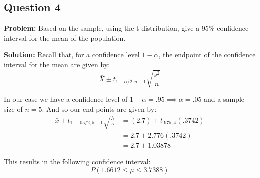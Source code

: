 \documentclass{article}
\begin{document}
\subsection*{Question 4}
\noindent\textbf{Problem:} Based on the sample, using the t-distribution, give a 95\% confidence interval for the mean of the population.
\bigskip

\noindent\textbf{Solution:} Recall that, for a confidence level $1-\alpha$, the endpoint of the confidence interval for the mean are given by:
$$\bar{X}\pm t_{1-\alpha/2,n-1}\sqrt{\frac{s^2}{n}}$$

In our case we have a confidence level of $1-\alpha=.95\implies \alpha=.05$ and a sample size of $n=5$. And so our end points are given by:
\begin{align*}
  \bar{x}\pm t_{1-.05/2,5-1}\sqrt{\frac{.7}{5}}&=(2.7)\pm t_{.975,4}(.3742)\\
  &=2.7\pm 2.776(.3742)\\
  &=2.7\pm 1.03878
\end{align*}

This results in the following confidence interval:
$$\boxed{P(1.6612\le\mu\le3.7388)}$$
\end{document}
